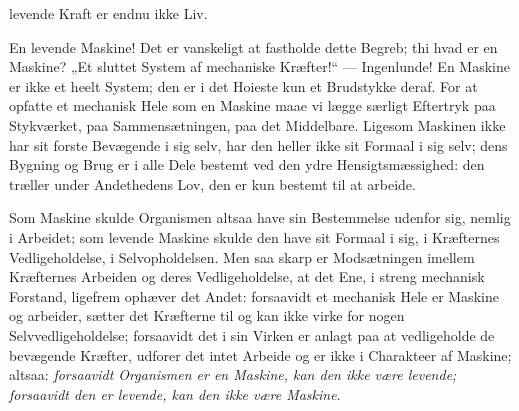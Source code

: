 \documentclass[11pt]{book}
\newcommand{\opage}[1]{\marginnote{\footnotesize\textit{[#1]}}}
\begin{document}
levende Kraft er endnu ikke Liv.
\opage{352} \setcounter{footnote}{0}%

En levende Maskine! Det er vanskeligt at fastholde dette Begreb;
thi hvad er en Maskine? „Et sluttet System af mechaniske Kræfter!“
--- Ingenlunde! En Maskine er ikke et heelt System; den er i det
Hoieste kun et Brudstykke deraf. For at opfatte et mechanisk Hele som
en Maskine maae vi lægge særligt Eftertryk paa Stykværket, paa
Sammensætningen, paa det Middelbare. Ligesom Maskinen ikke har sit
forste Bevægende i sig selv, har den heller ikke sit Formaal i sig selv;
dens Bygning og Brug er i alle Dele bestemt ved den ydre
Hensigtsmæssighed: den træller under Andethedens Lov, den er kun
bestemt til at arbeide.

Som Maskine skulde Organismen altsaa have sin Bestemmelse
udenfor sig, nemlig i Arbeidet; som levende Maskine skulde den have sit
Formaal i sig, i Kræfternes Vedligeholdelse, i Selvopholdelsen. Men saa
skarp er Modsætningen imellem Kræfternes Arbeiden og deres
Vedligeholdelse, at det Ene, i streng mechanisk Forstand, ligefrem ophæver det
Andet: forsaavidt et mechanisk Hele er Maskine og arbeider,
\opage{353} \setcounter{footnote}{0}%
sætter det Kræfterne til og kan ikke virke for nogen Selvvedligeholdelse;
forsaavidt det i sin Virken er anlagt paa at vedligeholde de bevægende
Kræfter, udforer det intet Arbeide og er ikke i Charakteer af Maskine;
altsaa: \emph{forsaavidt Organismen er en Maskine, kan den ikke være
levende; forsaavidt den er levende, kan den ikke være Maskine}.
\end{document}
